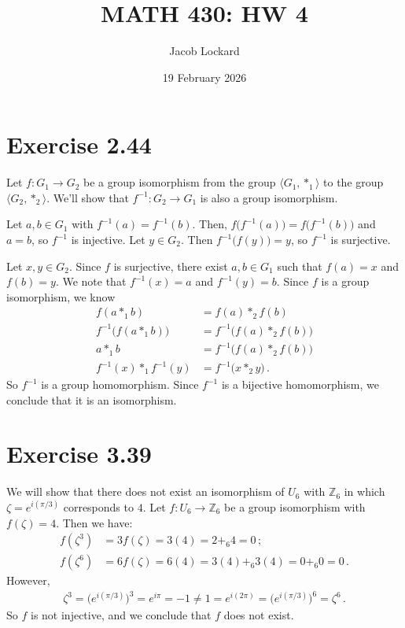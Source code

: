 \documentclass{article}
\begin{document}
\title{MATH 430: HW 4}
\author{Jacob Lockard}
\date{19 February 2026}

\maketitle

\section*{Exercise 2.44}

Let $f : G_1 \to G_2$ be a group isomorphism from the group
$\langle G_1, *_1 \rangle$ to the group $\langle G_2, *_2 \rangle$.
We'll show that $f^{-1} : G_2 \to G_1$ is also a group isomorphism.

Let $a, b \in G_1$ with $f^{-1}(a) = f^{-1}(b)$.
Then, $f\bigl( f^{-1}(a) \bigr) = f\bigl( f^{-1}(b) \bigr)$ and
$a = b$,
so $f^{-1}$ is injective. Let $y \in G_2$. Then $f^{-1}\bigl( f(y) \bigr) = y$, so
$f^{-1}$ is surjective.

Let $x, y \in G_2$. Since $f$ is surjective, there exist $a, b \in {G_1}$
such that $f(a) = x$ and $f(b) = y$. We note that $f^{-1}(x) = a$ and
$f^{-1}(y) = b$.
Since $f$ is a group isomorphism,
we know
\begin{align*}
    f(a *_1 b) &= f(a) *_2 f(b) \\
    f^{-1}\bigl( f(a *_1 b) \bigr) &= f^{-1}\bigl( f(a) *_2 f(b) \bigr) \\
    a *_1 b &= f^{-1}\bigl( f(a) *_2 f(b) \bigr) \\
    f^{-1}(x) *_1 f^{-1}(y) &= f^{-1}\bigl( x *_2 y \bigr) \,.
\end{align*}
So $f^{-1}$ is a group homomorphism. Since $f^{-1}$ is a bijective homomorphism,
we conclude that it is an isomorphism.

\qedsymbol

\section*{Exercise 3.39}

We will show that there does not exist an isomorphism of $U_6$ with
$\mathbb{Z}_6$ in which $\zeta = e^{i(\pi/3)}$ corresponds to $4$.
Let $f : U_6 \to \mathbb{Z}_6$ be a group isomorphism with
$f(\zeta) = 4$. Then we have:
\begin{align*}
    f(\zeta^3) &= 3 f(\zeta) = 3(4) = 2 +_6 4 = 0 \,; \\
    f(\zeta^6) &= 6 f(\zeta) = 6(4) = 3(4) +_6 3(4) = 0 +_6 0 = 0 \,.
\end{align*}
However,
\begin{align*}
    \zeta^3 = \bigl(e^{i(\pi/3)}\bigr)^3 = e^{i \pi} = -1
    \neq 1 = e^{i(2\pi)} = \bigl(e^{i(\pi/3)}\bigr)^6 = \zeta^6 \,.
\end{align*}
So $f$ is not injective, and we conclude that $f$ does not exist.
\end{document}
